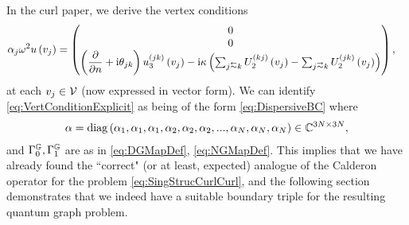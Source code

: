 \documentclass[11pt]{report}
\newcommand{\dgmap}{\dmap^{\graph}}
\newcommand{\ngmap}{\nmap^{\graph}}
\begin{document}
In the curl paper, we derive the vertex conditions
\begin{align} \label{eq:VertConditionExplicit}
	\alpha_j\omega^2 u\bracs{v_j} &=
	\begin{pmatrix}
	0 \\
	0 \\	
	\bracs{\pdiff{}{n} + \rmi\qm_{jk}}u_3^{(jk)}\bracs{v_j}
	- \rmi\wavenumber\bracs{ \sum_{j\conRight k} U_2^{(kj)}\bracs{v_j} - \sum_{j\conLeft k} U_2^{(jk)}\bracs{v_j} }
	\end{pmatrix},
\end{align}
at each $v_j\in\mathcal{V}$ (now expressed in vector form).
We can identify \eqref{eq:VertConditionExplicit} as being of the form \eqref{eq:DispersiveBC} where
\begin{align*}
	\alpha = 
	\mathrm{diag}\left( \alpha_1, \alpha_1, \alpha_1, \alpha_2, \alpha_2, \alpha_2, ..., \alpha_N, \alpha_N, \alpha_N \right) \in \mathbb{C}^{3N\times 3N},
\end{align*}
and $\dgmap, \ngmap$ are as in \eqref{eq:DGMapDef}, \eqref{eq:NGMapDef}.
This implies that we have already found the ``correct" (or at least, expected) analogue of the Calderon operator for the problem \eqref{eq:SingStrucCurlCurl}, and the following section demonstrates that we indeed have a suitable boundary triple for the resulting quantum graph problem.
\end{document}
